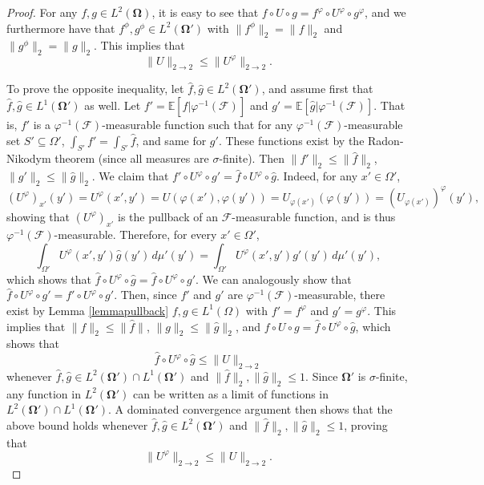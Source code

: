 \documentclass{amsart}
\numberwithin{equation}{section}
\numberwithin{figure}{section}
\theoremstyle{definition}
\theoremstyle{remark}
\newcommand{\bOmega}{{\mathbf{\Omega}}}
\newcommand{\EE}{\mathbb{E}}
\newcommand{\cF}{\mathcal{F}}
\begin{document}
\begin{proof}
For any $f,g \in L^2(\bOmega)$, it is easy to see that $f \circ U \circ g =
f^\varphi \circ U^\varphi \circ g^\varphi$, and we furthermore have that
$f^\phi,g^\phi\in L^2(\bOmega')$ with $\|f^\phi\|_2=\|f\|_2$ and
$\|g^\phi\|_2=\|g\|_2$. This implies that
\[\|U\|_{2 \rightarrow 2}\le \|U^\varphi\|_{2 \rightarrow 2}
.\]

To prove the opposite inequality, let $\widehat{f},\widehat{g} \in
L^2(\bOmega')$, and assume first that $\widehat{f},\widehat{g} \in
L^1(\bOmega')$ as well. Let $f'=\EE[\widehat{f}|\varphi^{-1}(\cF)]$ and
$g'=\EE[\widehat{g}|\varphi^{-1}(\cF)]$. That is, $f'$ is a
$\varphi^{-1}(\cF)$-measurable function such that for any
$\varphi^{-1}(\cF)$-measurable set $S'\subseteq \Omega'$, $\int_{S'}
f'=\int_{S'} \widehat{f}$, and same for $g'$. These functions exist by the
Radon-Nikodym theorem (since all measures are $\sigma$-finite). Then
$\|f'\|_2 \le \|\widehat{f}\|_2$, $\|g'\|_2 \le \|\widehat{g}\|_2$. We claim
that $f' \circ U^\varphi \circ g'=\widehat{f}\circ U^\varphi \circ
\widehat{g}$. Indeed, for any $x' \in \Omega'$,
\[
(U^\varphi)_{x'}(y')=U^\varphi(x',y')
=U(\varphi(x'),\varphi(y'))
=U_{\varphi(x')}(\varphi(y'))
=(U_{\varphi(x')})^\varphi (y'),
\]
showing that $(U^\varphi)_{x'}$ is the pullback of an $\cF$-measurable
function, and is thus $\varphi^{-1}(\cF)$-measurable. Therefore, for every
$x'\in\Omega'$,
\[
\int_{\Omega'} U^\varphi(x',y')\widehat{g}(y')\,d\mu'(y')=
\int_{\Omega'}U^\varphi(x',y')g'(y')\,d\mu'(y'),
\]
which shows that $\widehat{f} \circ U^\varphi \circ \widehat{g}=\widehat{f}
\circ U^\varphi \circ g'$. We can analogously show that $\widehat{f} \circ
U^\varphi \circ g'=f' \circ U^\varphi \circ g'$. Then, since $f'$ and $g'$
are $\varphi^{-1}(\cF)$-measurable, there exist by Lemma \ref{lemmapullback}
$f,g \in L^{{1}}(\Omega)$ with $f'=f^\varphi$ and $g' = g^\varphi$. This
implies that $\|f\|_2 \le \|\widehat{f}\|$, $\|g\|_2 \le \|\widehat{g}\|_2$,
and $f \circ U \circ g = \widehat{f} \circ U^\varphi \circ \widehat{g}$,
which shows that
\[
\widehat{f} \circ U^\varphi \circ \widehat{g}\leq \|U\|_{2 \rightarrow 2}
\]
whenever $\widehat{f},\widehat{g} \in L^2(\bOmega')\cap L^1(\bOmega')$ and
$\|\widehat{f}\|_2,\|\widehat{g}\|_2\leq 1$. Since $\bOmega'$ is
$\sigma$-finite, any function in $L^2(\bOmega')$ can be written as a limit of
functions in $L^2(\bOmega')\cap L^1(\bOmega')$. A dominated convergence
argument then shows that the above bound holds whenever
$\widehat{f},\widehat{g} \in L^2(\bOmega')$ and
$\|\widehat{f}\|_2,\|\widehat{g}\|_2\leq 1$, proving that
\[ \|U^\varphi\|_{2 \rightarrow 2}\le\|U\|_{2 \rightarrow 2}.\]


\end{proof}
\end{document}
